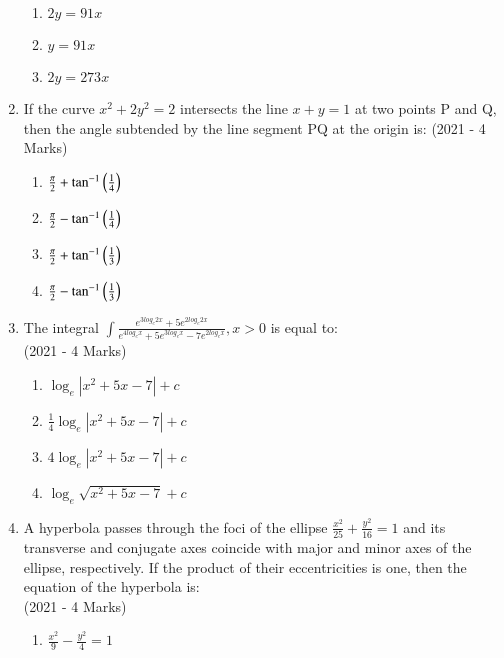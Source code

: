 \documentclass[journal]{IEEEtran}
\begin{document}
\begin{enumerate}
{\begin{multicols}{4}
\begin{enumerate}
					\item $2y = 91x$
					
					\item $y = 91x$
					
					\item $2y = 273x$
        		\end{enumerate}
        	\end{multicols}
        	
        }
 	\item{
			If the curve $x^2 + 2y^2 = 2$ intersects the line $x + y = 1$ at two points P and Q, then the angle subtended by the line segment PQ at the origin is:
			\hfill
			{(2021 - 4 Marks)}
			
			\begin{multicols}{4}
				\begin{enumerate}
					\item $\frac{\pi}{2} + \tan^{-1}\left(\frac{1}{4}\right)$
					\item $\frac{\pi}{2} - \tan^{-1}\left(\frac{1}{4}\right)$
					\item $\frac{\pi}{2} + \tan^{-1}\left(\frac{1}{3}\right)$
					\item $\frac{\pi}{2} - \tan^{-1}\left(\frac{1}{3}\right)$
				\end{enumerate}
			\end{multicols}
			
		}
 	\item{
			The integral $\int\frac{e^{3log_{e}2x} + 5e^{2log_{e}2x}}{e^{4log_{e}x}+ 5e^{3log_{e}x} - 7e^{2log_{e}x}}, x>0$ is equal to:\\ \text{ }
			\hfill
			{(2021 - 4 Marks)}
			
			\begin{multicols}{2}
				\begin{enumerate}
					\item $\log_e |x^2 + 5x - 7| + c$
					
					\item $\frac{1}{4} \log_e |x^2 + 5x - 7| + c$
					
					\item $4 \log_e |x^2 + 5x - 7| + c$
					
					\item $\log_e \sqrt{x^2 + 5x - 7} + c$
				\end{enumerate}
			\end{multicols}
			
		}
    \item{
            A hyperbola passes through the foci of the ellipse $\frac{x^2}{25} + \frac{y^2}{16} = 1$ and its transverse and conjugate axes coincide with major and minor axes of the ellipse, respectively. If the product of their eccentricities is one, then the equation of the hyperbola is:\\ \text{ }
             \hfill
                {(2021 - 4 Marks)}
            \begin{multicols}{2}
                \begin{enumerate}
                    \item $\frac{x^2}{9} - \frac{y^2}{4} = 1$
                    

\end{enumerate}
\end{multicols}}
\end{enumerate}
\end{document}
